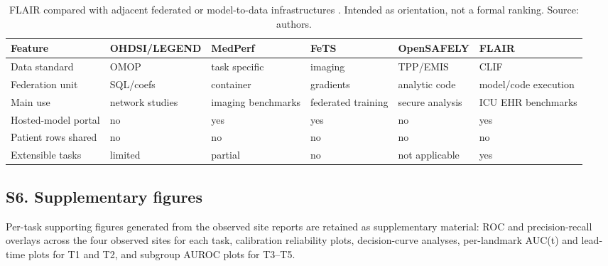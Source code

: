 \documentclass[12pt]{article}
\begin{document}
\begin{table}[h]
\centering
\footnotesize
\setlength{\tabcolsep}{3pt}
\begin{tabularx}{\linewidth}{lXXXXX}
\toprule
\textbf{Feature} & \textbf{OHDSI/\allowbreak LEGEND} & \textbf{MedPerf} & \textbf{FeTS} & \textbf{Open\allowbreak SAFELY} & \textbf{FLAIR} \\
\midrule
Data standard & OMOP & task specific & imaging & TPP/EMIS & CLIF \\
Federation unit & SQL/coefs & container & gradients & analytic code & model/code execution \\
Main use & network studies & imaging benchmarks & federated training & secure analysis & ICU EHR benchmarks \\
Hosted-model portal & no & yes & yes & no & yes \\
Patient rows shared & no & no & no & no & no \\
Extensible tasks & limited & partial & no & not applicable & yes \\
\bottomrule
\end{tabularx}
\caption{FLAIR compared with adjacent federated or model-to-data infrastructures \citep{reps2020ohdsistroke,karargyris2023medperf,pati2022fets,opensafely2021naturemedicine}. Intended as orientation, not a formal ranking. Source: authors.}
\label{tab:comparators}
\end{table}

\subsection*{S6. Supplementary figures}

Per-task supporting figures generated from the observed site reports are retained as supplementary material: ROC and precision-recall overlays across the four observed sites for each task, calibration reliability plots, decision-curve analyses, per-landmark AUC(t) and lead-time plots for T1 and T2, and subgroup AUROC plots for T3--T5.



\end{document}
